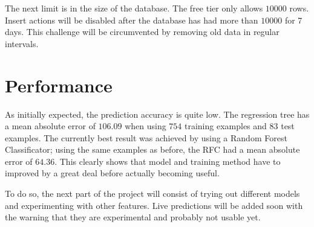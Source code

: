 The next limit is in the size of the database. The free tier only allows \(10000\) rows. Insert actions will be disabled after the database has had more than \(10000\) for 7 days. This challenge will be circumvented by removing old data in regular intervals.



\section{Performance}
As initially expected, the prediction accuracy is quite low. The regression tree has a mean absolute error of \(106.09\) when using \(754\) training examples and \(83\) test examples. The currently best result was achieved by using a Random Forest Classificator; using the same examples as before, the RFC had a mean absolute error of \(64.36\). This clearly shows that model and training method have to improved by a great deal before actually becoming useful. 

To do so, the next part of the project will consist of trying out different models and experimenting with other features. Live predictions will be added soon with the warning that they are experimental and probably not usable yet.
  



